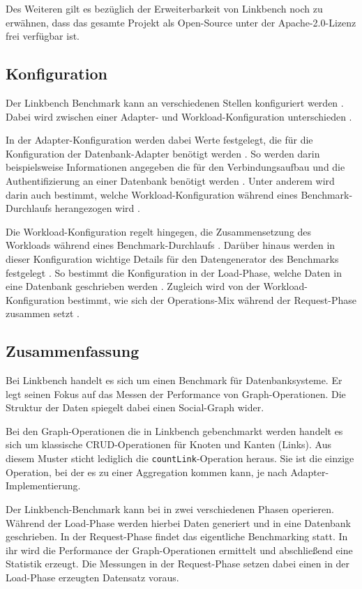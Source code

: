 Des Weiteren gilt es bezüglich der Erweiterbarkeit von Linkbench noch zu erwähnen, dass das gesamte Projekt als Open-Source unter der Apache-2.0-Lizenz frei verfügbar ist.

\subsection{Konfiguration}
Der Linkbench Benchmark kann an verschiedenen Stellen konfiguriert werden \cite{linkbench_paper,fb_linkbench_github}. Dabei wird zwischen einer Adapter- und Workload-Konfiguration unterschieden \cite{fb_linkbench_github}. 

In der Adapter-Konfiguration werden dabei Werte festgelegt, die für die Konfiguration der Datenbank-Adapter benötigt werden \cite{fb_linkbench_github}. So werden darin beispielsweise Informationen angegeben die für den Verbindungsaufbau und die Authentifizierung an einer Datenbank benötigt werden \cite{fb_linkbench_github}. Unter anderem wird darin auch bestimmt, welche Workload-Konfiguration während eines Benchmark-Durchlaufs herangezogen wird \cite{fb_linkbench_github}. 

Die Workload-Konfiguration regelt hingegen, die Zusammensetzung des Workloads während eines Benchmark-Durchlaufs \cite{fb_linkbench_github}. Darüber hinaus werden in dieser Konfiguration wichtige Details für den Datengenerator des Benchmarks festgelegt \cite{fb_linkbench_github}. So bestimmt die Konfiguration in der Load-Phase, welche Daten in eine Datenbank geschrieben werden \cite{fb_linkbench_github}. Zugleich wird von der Workload-Konfiguration bestimmt, wie sich der Operations-Mix während der Request-Phase zusammen setzt \cite{fb_linkbench_github}.

\subsection{Zusammenfassung}
Bei Linkbench handelt es sich um einen Benchmark für Datenbanksysteme. Er legt seinen Fokus auf das Messen der Performance von Graph-Operationen. Die Struktur der Daten spiegelt dabei einen Social-Graph wider. 

Bei den Graph-Operationen die in Linkbench gebenchmarkt werden handelt es sich um klassische CRUD-Operationen für Knoten und Kanten (Links). Aus diesem Muster sticht lediglich die \texttt{countLink}-Operation heraus. Sie ist die einzige Operation, bei der es zu einer Aggregation kommen kann, je nach Adapter-Implementierung. 

Der Linkbench-Benchmark kann bei in zwei verschiedenen Phasen operieren. Während der Load-Phase werden hierbei Daten generiert und in eine Datenbank geschrieben. In der Request-Phase findet das eigentliche Benchmarking statt. In ihr wird die Performance der Graph-Operationen ermittelt und abschließend eine Statistik erzeugt. Die Messungen in der Request-Phase setzen dabei einen in der Load-Phase erzeugten Datensatz voraus. 

